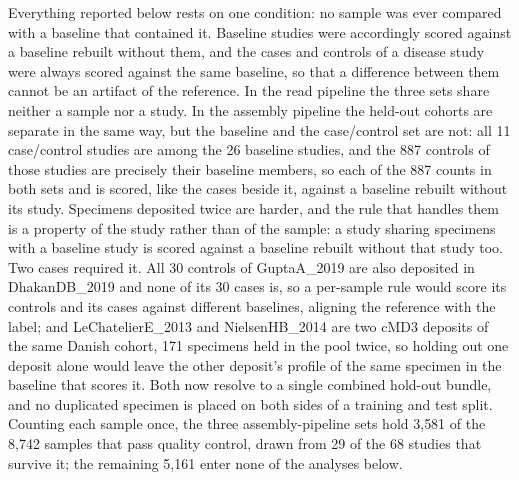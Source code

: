 \documentclass[conference]{IEEEtran}
\begin{document}
Everything reported below rests on one condition: no sample was ever compared with a baseline that contained it. Baseline studies were accordingly scored against a baseline rebuilt without them, and the cases and controls of a disease study were always scored against the same baseline, so that a difference between them cannot be an artifact of the reference. In the read pipeline the three sets share neither a sample nor a study. In the assembly pipeline the held-out cohorts are separate in the same way, but the baseline and the case/control set are not: all 11 case/control studies are among the 26 baseline studies, and the 887 controls of those studies are precisely their baseline members, so each of the 887 counts in both sets and is scored, like the cases beside it, against a baseline rebuilt without its study. Specimens deposited twice are harder, and the rule that handles them is a property of the study rather than of the sample: a study sharing specimens with a baseline study is scored against a baseline rebuilt without that study too. Two cases required it. All 30 controls of GuptaA\_2019 are also deposited in DhakanDB\_2019 and none of its 30 cases is, so a per-sample rule would score its controls and its cases against different baselines, aligning the reference with the label; and LeChatelierE\_2013 and NielsenHB\_2014 are two cMD3 deposits of the same Danish cohort, 171 specimens held in the pool twice, so holding out one deposit alone would leave the other deposit's profile of the same specimen in the baseline that scores it. Both now resolve to a single combined hold-out bundle, and no duplicated specimen is placed on both sides of a training and test split. Counting each sample once, the three assembly-pipeline sets hold 3{,}581 of the 8{,}742 samples that pass quality control, drawn from 29 of the 68 studies that survive it; the remaining 5{,}161 enter none of the analyses below.
\end{document}

